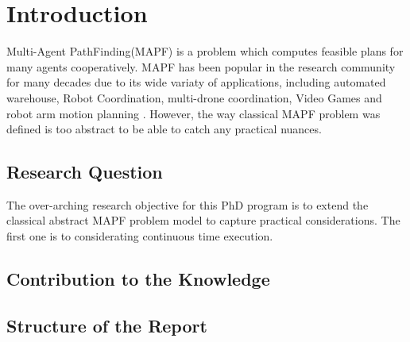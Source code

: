 \chapter{Introduction}
Multi-Agent PathFinding(MAPF) is a problem which computes feasible plans for many agents cooperatively.
MAPF has been popular in the research community for many decades due to its wide variaty of applications, including automated warehouse\cite{warehouse1_2008,warehouse2_2020,warehouse3_2017}, Robot Coordination\cite{robot_2016}, multi-drone coordination\cite{drone_2022}, Video Games\cite{vidGame_2022} and robot arm motion planning \cite{motion_planning_2021}.
However, the way classical MAPF problem was defined is too abstract to be able to catch any practical nuances.  

\section{Research Question}
The over-arching research objective for this PhD program is to extend the classical abstract MAPF problem model to capture practical considerations. 
The first one is to considerating continuous time execution. 
\section{Contribution to the Knowledge}
\section{Structure of the Report}
